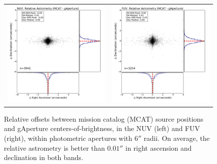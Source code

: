 \documentclass[preprint]{aastex}
\begin{document}
\begin{figure}[h]
\begin{tabular}{cc}
\includegraphics[scale=0.4]{Fig02a.pdf}&
\includegraphics[scale=0.4]{Fig02b.pdf}\\
\end{tabular}
\caption{Relative offsets between mission catalog (MCAT) source positions and gAperture centers-of-brightness, in the NUV (left) and FUV (right), within photometric apertures with $6''$ radii. On average, the relative astrometry is better than $0.01''$ in right ascension and declination in both bands.
\label{astrometry}}
\end{figure}
\end{document}

